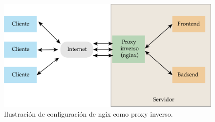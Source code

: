 \begin{figure}[htpb]
	\centering
	\includegraphics[scale=.7]{./Figures/ngix-proxy.png}
	\caption[Configuración Nginx como proxy inverso ]{Ilustración de configuración de ngix como proxy inverso.}
	\label{fig:proxy-nginx}
\end{figure}



















